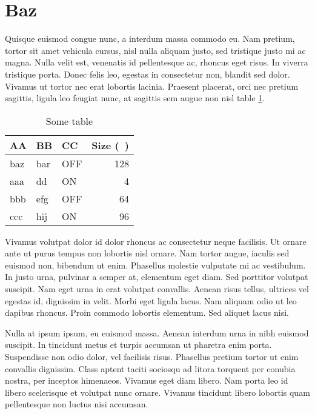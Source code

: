 \documentclass[a4paper, 12pt]{article}
\begin{document}
\clearpage
\section{Baz}
\label{section:baz}

Quisque euismod congue nunc, a interdum massa commodo eu. Nam pretium, tortor sit amet vehicula cursus, nisl nulla aliquam justo, sed tristique justo mi ac magna. Nulla velit est, venenatis id pellentesque ac, rhoncus eget risus. In viverra tristique porta. Donec felis leo, egestas in consectetur non, blandit sed dolor. Vivamus ut tortor nec erat lobortis lacinia. Praesent placerat, orci nec pretium sagittis, ligula leo feugiat nunc, at sagittis sem augue non nisl table \ref{table:sometable}.

\begin{table}[ht]
	\begin{center}
		\caption{Some table}
		\begin{tabular}{@{}lllr@{}}
			\toprule
			AA & BB & CC & Size (\si{\kilo\byte})  \\
			\midrule
			baz & bar & OFF & 128 \\
			aaa & dd & ON & 4 \\
			bbb & efg & OFF & 64 \\
			ccc & hij & ON & 96 \\
			\bottomrule
		\end{tabular}
		\label{table:sometable}
	\end{center}
\end{table}


Vivamus volutpat dolor id dolor rhoncus ac consectetur neque facilisis. Ut ornare ante ut purus tempus non lobortis nisl ornare. Nam tortor augue, iaculis sed euismod non, bibendum ut enim. Phasellus molestie vulputate mi ac vestibulum. In justo urna, pulvinar a semper at, elementum eget diam. Sed porttitor volutpat suscipit. Nam eget urna in erat volutpat convallis. Aenean risus tellus, ultrices vel egestas id, dignissim in velit. Morbi eget ligula lacus. Nam aliquam odio ut leo dapibus rhoncus. Proin commodo lobortis elementum. Sed aliquet lacus nisi.

Nulla at ipsum ipsum, eu euismod massa. Aenean interdum urna in nibh euismod suscipit. In tincidunt metus et turpis accumsan ut pharetra enim porta. Suspendisse non odio dolor, vel facilisis risus. Phasellus pretium tortor ut enim convallis dignissim. Class aptent taciti sociosqu ad litora torquent per conubia nostra, per inceptos himenaeos. Vivamus eget diam libero. Nam porta leo id libero scelerisque et volutpat nunc ornare. Vivamus tincidunt libero lobortis quam pellentesque non luctus nisi accumsan.


\clearpage
\printbibliography
\end{document}
